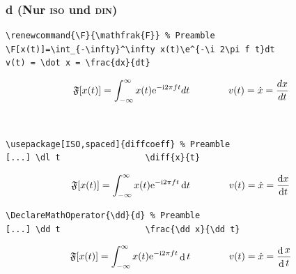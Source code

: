 \documentclass[aspectratio=169, 10pt]{beamer}
\DeclareMathOperator{\dd}{d}
\newcommand{\e}{\mathrm{e}}
\renewcommand{\i}{\mathrm{i}}
\begin{document}
\begin{frame}[fragile]
    \frametitle{d (Nur \textsc{iso} und \textsc{din})}
    \begin{wrong}
        \begin{lstlisting}
\renewcommand{\F}{\mathfrak{F}} % Preamble
\F[x(t)]=\int_{-\infty}^\infty x(t)\e^{-\i 2\pi f t}dt
v(t) = \dot x = \frac{dx}{dt}
        \end{lstlisting}
        \begin{equation*}
            \F[x(t)]=\int_{-\infty}^\infty x(t) \e^{-\i 2 \pi f t} d t
            \qquad\qquad
            v(t) = \dot x = \frac{dx}{dt}
        \end{equation*}
    \end{wrong}\\[2ex]
    \pause

    \begin{lstlisting}
\usepackage[ISO,spaced]{diffcoeff} % Preamble
[...] \dl t                 \diff{x}{t}
    \end{lstlisting}
    \begin{equation*}
        \F[x(t)]=\int_{-\infty}^\infty x(t)\e^{-\i 2 \pi f t}\dl t
        \qquad\qquad
        v(t) = \dot x = \diff{x}{t}
    \end{equation*}
    \pause

    \begin{lstlisting}
\DeclareMathOperator{\dd}{d} % Preamble
[...] \dd t                 \frac{\dd x}{\dd t}
        \end{lstlisting}
    \begin{equation*}
        \F[x(t)]=\int_{-\infty}^\infty x(t)\e^{-\i 2\pi f t}\dd t
        \qquad\qquad
        v(t) = \dot x = \frac{\dd x}{\dd t}
    \end{equation*}
\end{frame}
\end{document}
